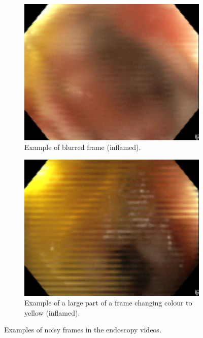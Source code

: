 \begin{figure}
	\begin{subfigure}{0.4\linewidth}
		\centering
		\includegraphics[width=\linewidth]{Materials/Discussion/idx_4_frame_750}
		\caption{Example of blurred frame (inflamed).\newline}
	\end{subfigure}
	\hspace{0.5cm}
	\begin{subfigure}{0.4\linewidth}
		\centering
		\includegraphics[width=\linewidth]{Materials/Discussion/idx_4_frame_840}
		\caption{Example of a large part of a frame changing colour to yellow (inflamed).}
	\end{subfigure}
	\caption{Examples of noisy frames in the endoscopy videos.}
	\label{noisyFrames}
\end{figure}

